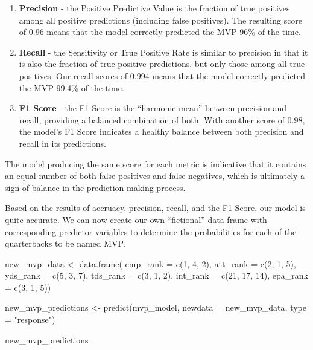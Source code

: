 \documentclass[
  letterpaper,
]{krantz}
\newenvironment{Shaded}{\begin{snugshade}}{\end{snugshade}}
\newcommand{\AttributeTok}[1]{\textcolor[rgb]{0.40,0.45,0.13}{#1}}
\newcommand{\DecValTok}[1]{\textcolor[rgb]{0.68,0.00,0.00}{#1}}
\newcommand{\FunctionTok}[1]{\textcolor[rgb]{0.28,0.35,0.67}{#1}}
\newcommand{\NormalTok}[1]{\textcolor[rgb]{0.00,0.23,0.31}{#1}}
\newcommand{\OtherTok}[1]{\textcolor[rgb]{0.00,0.23,0.31}{#1}}
\newcommand{\StringTok}[1]{\textcolor[rgb]{0.13,0.47,0.30}{#1}}
\providecommand{\tightlist}{%
  \setlength{\itemsep}{0pt}\setlength{\parskip}{0pt}}\usepackage{longtable,booktabs,array}
\begin{document}
\begin{tcolorbox}
\begin{enumerate}
\def\labelenumi{\arabic{enumi}.}
\tightlist
\item
  \textbf{Precision} - the Positive Predictive Value is the fraction of
  true positives among all positive predictions (including false
  positives). The resulting score of 0.96 means that the model correctly
  predicted the MVP 96\% of the time.
\item
  \textbf{Recall} - the Sensitivity or True Positive Rate is similar to
  precision in that it is also the fraction of true positive
  predictions, but only those among all true positives. Our recall
  scores of 0.994 means that the model correctly predicted the MVP
  99.4\% of the time.
\item
  \textbf{F1 Score} - the F1 Score is the ``harmonic mean'' between
  precision and recall, providing a balanced combination of both. With
  another score of 0.98, the model's F1 Score indicates a healthy
  balance between both precision and recall in its predictions.
\end{enumerate}

The model producing the same score for each metric is indicative that it
contains an equal number of both false positives and false negatives,
which is ultimately a sign of balance in the prediction making process.

\end{tcolorbox}

Based on the results of accruacy, precision, recall, and the F1 Score,
our model is quite accurate. We can now create our own ``fictional''
data frame with corresponding predictor variables to determine the
probabilities for each of the quarterbacks to be named MVP.

\begin{Shaded}
\begin{Highlighting}[]
\NormalTok{new\_mvp\_data }\OtherTok{\textless{}{-}} \FunctionTok{data.frame}\NormalTok{(}
  \AttributeTok{cmp\_rank =} \FunctionTok{c}\NormalTok{(}\DecValTok{1}\NormalTok{, }\DecValTok{4}\NormalTok{, }\DecValTok{2}\NormalTok{),}
  \AttributeTok{att\_rank =} \FunctionTok{c}\NormalTok{(}\DecValTok{2}\NormalTok{, }\DecValTok{1}\NormalTok{, }\DecValTok{5}\NormalTok{),}
  \AttributeTok{yds\_rank =} \FunctionTok{c}\NormalTok{(}\DecValTok{5}\NormalTok{, }\DecValTok{3}\NormalTok{, }\DecValTok{7}\NormalTok{),}
  \AttributeTok{tds\_rank =} \FunctionTok{c}\NormalTok{(}\DecValTok{3}\NormalTok{, }\DecValTok{1}\NormalTok{, }\DecValTok{2}\NormalTok{),}
  \AttributeTok{int\_rank =} \FunctionTok{c}\NormalTok{(}\DecValTok{21}\NormalTok{, }\DecValTok{17}\NormalTok{, }\DecValTok{14}\NormalTok{),}
  \AttributeTok{epa\_rank =} \FunctionTok{c}\NormalTok{(}\DecValTok{3}\NormalTok{, }\DecValTok{1}\NormalTok{, }\DecValTok{5}\NormalTok{))}

\NormalTok{new\_mvp\_predictions }\OtherTok{\textless{}{-}} \FunctionTok{predict}\NormalTok{(mvp\_model,}
                               \AttributeTok{newdata =}\NormalTok{ new\_mvp\_data, }\AttributeTok{type =} \StringTok{"response"}\NormalTok{)}

\NormalTok{new\_mvp\_predictions}
\end{Highlighting}
\end{Shaded}
\end{document}
